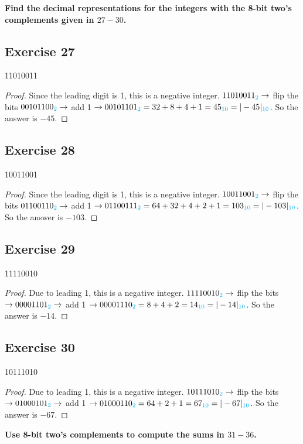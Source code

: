\documentclass[14pt]{extarticle}
\newcommand{\base}[1]{{\color{cyan}#1}} \newcommand{\da}{\downarrow}
\begin{document}
{\bf\color{cyan} Find the decimal representations for the integers with the
8-bit two’s complements given in $27-30$.}

\subsection{Exercise 27} 11010011
\begin{proof} Since the leading digit is 1, this is a negative integer.
$11010011_\base{2} \to $ flip the bits $00101100_\base{2} \to$ add 1 $\to
00101101_\base{2} = 32 + 8 + 4 + 1 = 45_\base{10} = |-45|_\base{10}$. So the
answer is $-45$. \end{proof}

\subsection{Exercise 28} 10011001
\begin{proof} Since the leading digit is 1, this is a negative integer.
$10011001_\base{2} \to $ flip the bits $01100110_\base{2} \to$ add 1 $\to
01100111_\base{2} = 64 + 32 + 4 + 2 + 1 = 103_\base{10} = |-103|_\base{10}$. So
the answer is $-103$. \end{proof}

\subsection{Exercise 29} 11110010
\begin{proof} Due to leading 1, this is a negative integer. $11110010_\base{2}
\to $ flip the bits $\to 00001101_\base{2} \to$ add 1 $\to 00001110_\base{2} = 8
+ 4 + 2 = 14_\base{10} = |-14|_\base{10}$. So the answer is $-14$. \end{proof}

\subsection{Exercise 30} 10111010
\begin{proof} Due to leading 1, this is a negative integer. $10111010_\base{2}
\to $ flip the bits $\to 01000101_\base{2} \to$ add 1 $\to 01000110_\base{2} =
64 + 2 + 1 = 67_\base{10} = |-67|_\base{10}$. So the answer is $-67$.
\end{proof}

{\bf \color{cyan} Use 8-bit two’s complements to compute the sums in $31-36$.}
\end{document}
